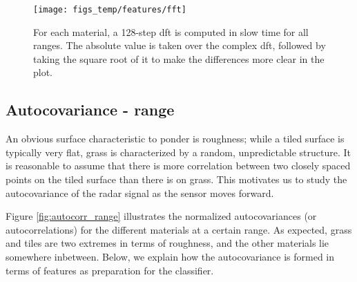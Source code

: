 
\begin{figure}[h]
	\centering
	\texttt{[image: figs\_temp/features/fft]}
	\caption{For each material, a 128-step \gls{dft} is computed in slow time for all ranges. The absolute value is taken over the complex \gls{dft}, followed by taking the square root of it to make the differences more clear in the plot. }
	\label{fig:fft}
\end{figure}


\subsection{Autocovariance - range}
\label{ACr}
An obvious surface characteristic to ponder is roughness; while a tiled surface is typically very flat, grass is characterized by a random, unpredictable structure. It is reasonable to assume that there is more correlation between two closely spaced points on the tiled surface than there is on grass. This motivates us to study the autocovariance of the radar signal as the sensor moves forward.

Figure \ref{fig:autocorr_range} illustrates the normalized autocovariances (or autocorrelations) for the different materials at a certain range. As expected, grass and tiles are two extremes in terms of roughness, and the other materials lie somewhere inbetween. Below, we explain how the autocovariance is formed in terms of features as preparation for the classifier.

